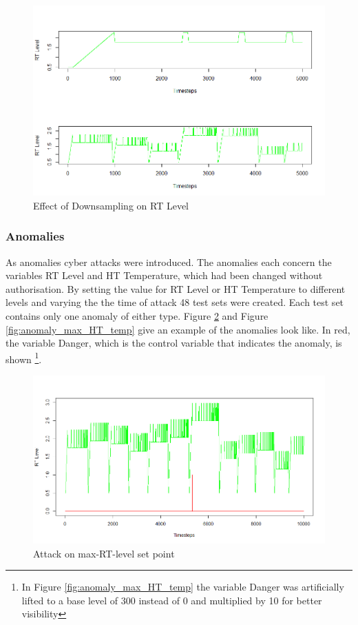 \begin{figure}[h]
	\centering
	\includegraphics[scale=0.6]{Figures/downsample}
	\decoRule
	\caption[Effect of Downsampling]{Effect of Downsampling on RT Level \parencite{Own}}
	\label{fig:downsample}
\end{figure}

\newpage
\subsubsection{Anomalies} \label{GHL_Anomalies}
As anomalies cyber attacks were introduced. The anomalies each concern the variables RT Level and HT Temperature, which had been changed without authorisation. By setting the value for RT Level or HT Temperature to different levels and varying the the time of attack 48 test sets were created. Each test set contains only one anomaly of either type. Figure \ref{fig:anomaly_max_RT_level} and Figure \ref{fig:anomaly_max_HT_temp} give an example of the anomalies look like. In red, the variable Danger, which is the control variable that indicates the anomaly, is shown \footnote{In Figure \ref{fig:anomaly_max_HT_temp} the variable Danger was artificially lifted to a base level of 300 instead of 0 and multiplied by 10 for better visibility}.

\begin{figure}[h]
	\centering
	\includegraphics[scale=0.4]{Figures/anomaly_max_RT_level}
	\decoRule
	\caption[Attack on max-RT-level set point]{Attack on max-RT-level set point \parencite{Own}}
	\label{fig:anomaly_max_RT_level}
\end{figure}

